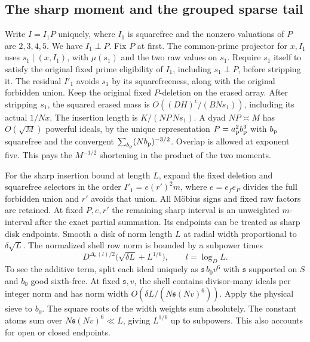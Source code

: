 \subsection{The sharp moment and the grouped sparse tail}
\label{pca:detail-sparse}

Write \(I=I_1P\) uniquely, where \(I_1\) is squarefree and the
nonzero valuations of \(P\) are \(2,3,4,5\). We have \(I_1\perp P\).
Fix \(P\) at first. The common-prime projector for \(x,I_1\)
uses \(s_1\mid(x,I_1)\), with \(\mu(s_1)\) and the two raw
values on \(s_1\). Require \(s_1\) itself to satisfy the original
fixed prime eligibility of \(I_1\), including \(s_1\perp P\),
before stripping it. The residual \(I'_1\) avoids \(s_1\)
by its squarefreeness, along with the original forbidden union.
Keep the original fixed \(P\)-deletion on the erased array.
After stripping \(s_1\), the squared erased mass is
\(O((DH)^\epsilon/(B Ns_1))\), including its actual \(1/Nx\).
The insertion length is \(K/(NP\,Ns_1)\).
A dyad \(NP\asymp M\) has \(O(\sqrt M)\) powerful ideals,
by the unique representation \(P=a_{\rm p}^2b_{\rm p}^3\)
with \(b_{\rm p}\) squarefree and the convergent
\(\sum_{b_{\rm p}}(Nb_{\rm p})^{-3/2}\). Overlap is allowed
at exponent five. This pays the \(M^{-1/2}\) shortening in
the product of the two moments.

For the sharp insertion bound at length \(L\), expand the
fixed deletion and squarefree selectors in the order
\(I'_1=e(r')^2m\), where \(e=e_f e_P\) divides the full forbidden
union and \(r'\) avoids that union. All Möbius signs and
fixed raw factors are retained. At fixed \(P,e,r'\) the remaining
sharp interval is an unweighted \(m\)-interval after the exact
partial summation. Its endpoints can be treated as sharp disk
endpoints. Smooth a disk of norm length \(L\) at radial width
proportional to \(\delta\sqrt L\). The normalized shell row
norm is bounded by a subpower times
\[
 D^{\Delta_a(l)/2}\bigl(\sqrt{\delta L}+L^{1/6}\bigr),
 \qquad l=\log_D L.
\]
To see the additive term, split each ideal uniquely as
\(\mathfrak s\,b_0 v^6\) with \(\mathfrak s\) supported on \(S\)
and \(b_0\) good sixth-free. At fixed \(\mathfrak s,v\),
the shell contains divisor-many ideals per integer norm and
has norm width \(O(\delta L/(N\mathfrak s(Nv)^6))\).
Apply the physical sieve to \(b_0\). The square roots of the
width weights sum absolutely. The constant atoms sum over
\(N\mathfrak s(Nv)^6\ll L\), giving \(L^{1/6}\) up to
subpowers. This also accounts for open or closed endpoints.

